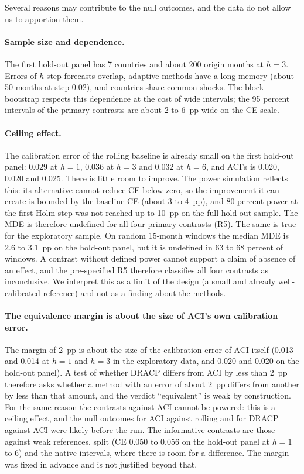 Several reasons may contribute to the null outcomes, and the data do not allow us to apportion them.

\paragraph{Sample size and dependence.} The first hold-out panel has 7 countries and about 200 origin months at $h=3$. Errors of $h$-step forecasts overlap, adaptive methods have a long memory (about 50 months at step 0.02), and countries share common shocks. The block bootstrap respects this dependence at the cost of wide intervals; the 95 percent intervals of the primary contrasts are about 2 to 6~pp wide on the CE scale.

\paragraph{Ceiling effect.} The calibration error of the rolling baseline is already small on the first hold-out panel: 0.029 at $h=1$, 0.036 at $h=3$ and 0.032 at $h=6$, and ACI's is 0.020, 0.020 and 0.025. There is little room to improve. The power simulation reflects this: its alternative cannot reduce CE below zero, so the improvement it can create is bounded by the baseline CE (about 3 to 4~pp), and 80 percent power at the first Holm step was not reached up to 10~pp on the full hold-out sample. The MDE is therefore undefined for all four primary contrasts (R5). The same is true for the exploratory sample. On random 15-month windows the median MDE is 2.6 to 3.1~pp on the hold-out panel, but it is undefined in 63 to 68 percent of windows. A contrast without defined power cannot support a claim of absence of an effect, and the pre-specified R5 therefore classifies all four contrasts as inconclusive. We interpret this as a limit of the design (a small and already well-calibrated reference) and not as a finding about the methods.

\paragraph{The equivalence margin is about the size of ACI's own calibration error.} The margin of 2~pp is about the size of the calibration error of ACI itself (0.013 and 0.014 at $h=1$ and $h=3$ in the exploratory data, and 0.020 and 0.020 on the hold-out panel). A test of whether DRACP differs from ACI by less than 2~pp therefore asks whether a method with an error of about 2~pp differs from another by less than that amount, and the verdict ``equivalent'' is weak by construction. For the same reason the contrasts against ACI cannot be powered: this is a ceiling effect, and the null outcomes for ACI against rolling and for DRACP against ACI were likely before the run. The informative contrasts are those against weak references, split (CE 0.050 to 0.056 on the hold-out panel at $h=1$ to 6) and the native intervals, where there is room for a difference. The margin was fixed in advance and is not justified beyond that.

